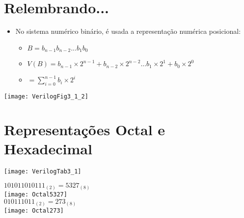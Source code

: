 

\subtitle{Representação Numérica e Circuitos Aritméticos} %



\begin{frame}
	\titlepage
\end{frame} 


\section{Relembrando...}

\begin{frame}{\insertsection}
	\begin{itemize}
        \item No sistema numérico binário, é usada a representação numérica posicional:
        \begin{itemize}
            \item $B = b_{n-1}b_{n-2} ... b_1 b_0$
            \item $V(B) = b_{n-1} \times 2^{n-1} + b_{n-2} \times 2^{n-2} ... b_1 \times 2^1 + b_0 \times 2^0$
            \item $= \sum\limits_{i=0}^{n-1} b_i \times 2^i$
        \end{itemize}
    \end{itemize}
    \center \texttt{[image: VerilogFig3\_1\_2]}
\end{frame}

\section{Representações Octal e Hexadecimal}

\begin{frame}{\insertsection}
    \center \texttt{[image: VerilogTab3\_1]}
\end{frame}

\begin{frame}{\insertsection}
    \center
    $101011010111_{(2)}=5327_{(8)}$ \\
    \texttt{[image: Octal5327]} \\
    \vspace{2cm}
    \pause
    $010111011_{(2)}=273_{(8)}$ \\
    \texttt{[image: Octal273]} \\
\end{frame}

